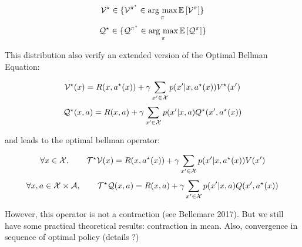 \begin{definition}
    \[ \mathcal{V}^{\star} \in \{\mathcal{V}^{\pi^{\star}} \in \operatorname*{\mbox{arg max}}_\pi \mathbb{E}\left[ \mathcal{V}^\pi \right]\} \]
    \[ \mathcal{Q}^{\star} \in \{\mathcal{Q}^{\pi^{\star}} \in \operatorname*{\mbox{arg max}}_\pi \mathbb{E}\left[ \mathcal{Q}^\pi \right]\} \]  
\end{definition}

This distribution also verify an extended version of the Optimal Bellman Equation:

\[ \mathcal{V}^{\star}(x) =  R(x,a^{\star}(x)) + \gamma \sum_{x^\prime  \in \mathcal{X}} p(x^\prime |x,a^{\star}(x))V^{\star}(x^\prime ) \]
\[ \mathcal{Q}^{\star}(x,a) = R(x,a) + \gamma \sum_{x^\prime  \in \mathcal{X}} p(x^\prime |x,a)Q^{\star}(x^\prime ,a^{\star}(x)) \]

and leads to the optimal bellman operator:

\begin{definition}
    \[ \forall x \in \mathcal{X}, \qquad \mathcal{T}^{\star} \mathcal{V}(x) = R(x,a^{\star}(x)) + \gamma \sum_{x^\prime  \in \mathcal{X}} p(x^\prime |x,a^{\star}(x)) V(x^\prime ) \]
    \[ \forall x,a \in \mathcal{X} \times \mathcal{A}, \qquad \mathcal{T}^{\star} \mathcal{Q}(x,a) = R(x,a) + \gamma \sum_{x^\prime  \in \mathcal{X}} p(x^\prime |x,a) Q(x^\prime ,a^{\star}(x)) \]
\end{definition}

However, this operator is not a contraction (see Bellemare 2017). But we still have some practical theoretical results: contraction in mean. Also, convergence in sequence of optimal policy (details ?)